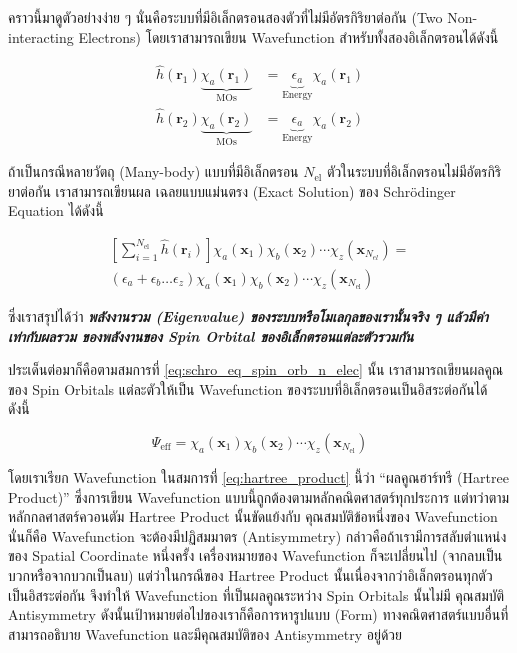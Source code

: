 คราวนี้มาดูตัวอย่างง่าย ๆ นั่นคือระบบที่มีอิเล็กตรอนสองตัวที่ไม่มีอัตรกิริยาต่อกัน (Two Non-interacting Electrons) โดยเราสามารถเขียน 
Wavefunction สำหรับทั้งสองอิเล็กตรอนได้ดังนี้

\begin{align}\label{eq:hamil_spin_orb_two_elec}
    \hat{h}(\bm{r}_{1}) \underbrace{\chi_{a}(\bm{r}_{1})}_{\text{MOs}} &= 
    \underbrace{\epsilon_{a}}_{\text{Energy}} \chi_{a}(\bm{r}_{1}) \\
    \hat{h}(\bm{r}_{2}) \underbrace{\chi_{a}(\bm{r}_{2})}_{\text{MOs}} &= 
    \underbrace{\epsilon_{a}}_{\text{Energy}} \chi_{a}(\bm{r}_{2})
\end{align}

ถ้าเป็นกรณีหลายวัตถุ (Many-body) แบบที่มีอิเล็กตรอน $N_{\text{el}}$ ตัวในระบบที่อิเล็กตรอนไม่มีอัตรกิริยาต่อกัน เราสามารถเขียนผล%
เฉลยแบบแม่นตรง (Exact Solution) ของ Schr\"{o}dinger Equation ได้ดังนี้

\begin{multline}\label{eq:schro_eq_spin_orb_n_elec}
    \left [ \sum_{i=1}^{N_{\text{el}}} \hat{h}(\bm{r}_{i}) \right ] \chi_{a}(\bm{x}_{1}) \chi_{b}(\bm{x}_{2}) 
    \cdots \chi_{z}(\bm{x}_{N_{el}}) = \\
    (\epsilon_{a} + \epsilon_{b} \dots \epsilon_{z}) \chi_{a}(\bm{x}_{1}) \chi_{b}(\bm{x}_{2}) \cdots 
    \chi_{z}(\bm{x}_{N_{\text{el}}})
\end{multline}

\noindent ซึ่งเราสรุปได้ว่า \textbf{\textit{พลังงานรวม (Eigenvalue) ของระบบหรือโมเลกุลของเรานั้นจริง ๆ แล้วมีค่าเท่ากับผลรวม%
ของพลังงานของ Spin Orbital ของอิเล็กตรอนแต่ละตัวรวมกัน}}

ประเด็นต่อมาก็คือตามสมการที่ \ref{eq:schro_eq_spin_orb_n_elec} นั้น เราสามารถเขียนผลคูณของ Spin Orbitals แต่ละตัวให้เป็น
Wavefunction ของระบบที่อิเล็กตรอนเป็นอิสระต่อกันได้ ดังนี้

\begin{equation}\label{eq:hartree_product}
    \Psi_{\text{eff}} = \chi_{a}(\bm{x}_{1}) \chi_{b}(\bm{x}_{2}) \cdots \chi_{z}(\bm{x}_{N_{\text{el}}})
\end{equation}

\noindent โดยเราเรียก Wavefunction ในสมการที่ \ref{eq:hartree_product} นี้ว่า \enquote{ผลคูณฮาร์ทรี (Hartree Product)}
ซึ่งการเขียน Wavefunction แบบนี้ถูกต้องตามหลักคณิตศาสตร์ทุกประการ แต่ทว่าตามหลักกลศาสตร์ควอนตัม Hartree Product นั้นขัดแย้งกับ%
คุณสมบัติข้อหนึ่งของ Wavefunction นั่นก็คือ Wavefunction จะต้องมีปฏิสมมาตร (Antisymmetry) กล่าวคือถ้าเรามีการสลับตำแหน่งของ 
Spatial Coordinate หนึ่งครั้ง เครื่องหมายของ Wavefunction ก็จะเปลี่ยนไป (จากลบเป็นบวกหรือจากบวกเป็นลบ) แต่ว่าในกรณีของ 
Hartree Product นั้นเนื่องจากว่าอิเล็กตรอนทุกตัวเป็นอิสระต่อกัน จึงทำให้ Wavefunction ที่เป็นผลคูณระหว่าง Spin Orbitals นั้นไม่มี%
คุณสมบัติ Antisymmetry ดังนั้นเป้าหมายต่อไปของเราก็คือการหารูปแบบ (Form) ทางคณิตศาสตร์แบบอื่นที่สามารถอธิบาย Wavefunction 
และมีคุณสมบัติของ Antisymmetry อยู่ด้วย 

